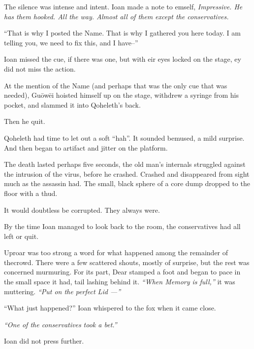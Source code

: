 The silence was intense and intent. Ioan made a note to emself, \emph{Impressive. He has them hooked. All the way. Almost all of them except the conservatives.}

``That is why I posted the Name. That is why I gathered you here today. I am telling you, we need to fix this, and I have--''

Ioan missed the cue, if there was one, but with eir eyes locked on the stage, ey did not miss the action.

At the mention of the Name (and perhaps that was the only cue that was needed), Guōwēi hoisted himself up on the stage, withdrew a syringe from his pocket, and slammed it into Qoheleth's back.

Then he quit.

Qoheleth had time to let out a soft ``hah''. It sounded bemused, a mild surprise. And then began to artifact and jitter on the platform.

The death lasted perhaps five seconds, the old man's internals struggled against the intrusion of the virus, before he crashed. Crashed and disappeared from sight much as the assassin had. The small, black sphere of a core dump dropped to the floor with a thud.

It would doubtless be corrupted. They always were.

By the time Ioan managed to look back to the room, the conservatives had all left or quit.

Uproar was too strong a word for what happened among the remainder of thecrowd. There were a few scattered shouts, mostly of surprise, but the rest was concerned murmuring. For its part, Dear stamped a foot and began to pace in the small space it had, tail lashing behind it. \emph{``When Memory is full,''} it was muttering. \emph{``Put on the perfect Lid —''}

``What just happened?'' Ioan whispered to the fox when it came close.

\emph{``One of the conservatives took a bet.''}

Ioan did not press further.
